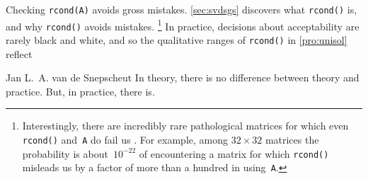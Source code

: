 Checking \verb|rcond(A)| avoids gross mistakes.
\cref{sec:svdsgs} discovers what \verb|rcond()| is, and why \verb|rcond()| avoids mistakes.%
\footnote{Interestingly, there are incredibly rare pathological matrices for which even \texttt{rcond()} and~\texttt{A\slosh} do fail us \cite[]{Driscoll07}.  
For example, among \(32\times32\) matrices the probability is about~\(10^{-22}\) of encountering a matrix for which \texttt{rcond()} misleads us by a factor of more than a hundred in using~\texttt{A\slosh}.}
In practice, decisions about acceptability are rarely black and white, and so the qualitative ranges of \verb|rcond()| in \cref{pro:unisol} reflect 

\begin{quoted}{Jan L.~A. van de Snepscheut}
In theory, there is no difference between theory and practice. 
But, in practice, there is. 
\end{quoted}



